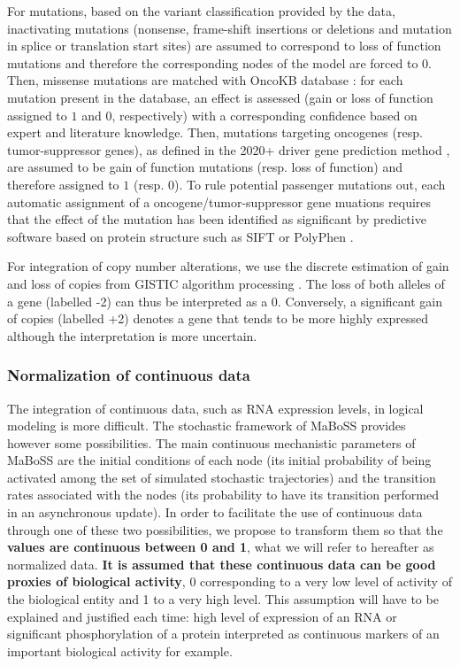 \documentclass[a4paper,12pt,twoside,onecolumn,openright,final,oldfontcommands]{memoir}
\begin{document}
For mutations, based on the variant classification provided by the data,
inactivating mutations (nonsense, frame-shift insertions or deletions
and mutation in splice or translation start sites) are assumed to
correspond to loss of function mutations and therefore the corresponding
nodes of the model are forced to \(0\). Then, missense mutations are
matched with OncoKB database \citep{chakravarty2017oncokb}: for each
mutation present in the database, an effect is assessed (gain or loss of
function assigned to \(1\) and \(0\), respectively) with a corresponding
confidence based on expert and literature knowledge. Then, mutations
targeting oncogenes (resp. tumor-suppressor genes), as defined in the
2020+ driver gene prediction method \citep{tokheim2016evaluating}, are
assumed to be gain of function mutations (resp. loss of function) and
therefore assigned to \(1\) (resp. \(0\)). To rule potential passenger
mutations out, each automatic assignment of a oncogene/tumor-suppressor
gene muations requires that the effect of the mutation has been
identified as significant by predictive software based on protein
structure such as SIFT \citep{kumar2009predicting} or PolyPhen
\citep{adzhubei2010method}.

For integration of copy number alterations, we use the discrete
estimation of gain and loss of copies from GISTIC algorithm processing
\citep{mermel2011gistic}. The loss of both alleles of a gene (labelled
-2) can thus be interpreted as a 0. Conversely, a significant gain of
copies (labelled +2) denotes a gene that tends to be more highly
expressed although the interpretation is more uncertain.

\subsubsection{Normalization of continuous
data}\label{normalization-of-continuous-data}

The integration of continuous data, such as RNA expression levels, in
logical modeling is more difficult. The stochastic framework of MaBoSS
provides however some possibilities. The main continuous mechanistic
parameters of MaBoSS are the initial conditions of each node (its
initial probability of being activated among the set of simulated
stochastic trajectories) and the transition rates associated with the
nodes (its probability to have its transition performed in an
asynchronous update). In order to facilitate the use of continuous data
through one of these two possibilities, we propose to transform them so
that the \textbf{values are continuous between 0 and 1}, what we will
refer to hereafter as normalized data. \textbf{It is assumed that these
continuous data can be good proxies of biological activity}, 0
corresponding to a very low level of activity of the biological entity
and 1 to a very high level. This assumption will have to be explained
and justified each time: high level of expression of an RNA or
significant phosphorylation of a protein interpreted as continuous
markers of an important biological activity for example.
\end{document}
